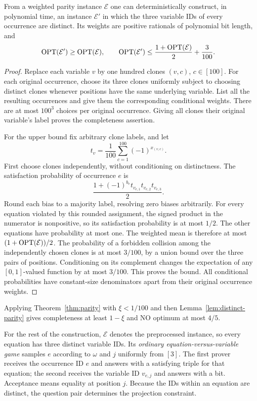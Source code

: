 \begin{lemma}
\label{lem:distinct-parity}
From a weighted parity instance \(\mathcal E\) one can deterministically
construct, in polynomial time, an instance \(\mathcal E'\) in which the
three variable IDs of every occurrence are distinct.  Its weights are
positive rationals of polynomial bit length, and
\[
 \operatorname{OPT}(\mathcal E')\ge\operatorname{OPT}(\mathcal E),
 \qquad
 \operatorname{OPT}(\mathcal E')
 \le \frac{1+\operatorname{OPT}(\mathcal E)}2+\frac3{100}.
\]
\end{lemma}

\begin{proof}
Replace each variable \(v\) by one hundred clones \((v,c)\),
\(c\in[100]\).  For each original occurrence, choose its three clones
uniformly subject to choosing distinct clones whenever positions have
the same underlying variable.  List all the resulting occurrences and
give them the corresponding conditional weights.  There are at most
\(100^3\) choices per original occurrence.  Giving all clones their
original variable's label proves the completeness assertion.

For the upper bound fix arbitrary clone labels, and let
\[
 t_v=\frac1{100}\sum_{c=1}^{100}(-1)^{x_{(v,c)}}.
\]
First choose clones independently, without conditioning on distinctness.
The satisfaction probability of occurrence \(e\) is
\[
 \frac{1+(-1)^{b_e}t_{v_{e,1}}t_{v_{e,2}}t_{v_{e,3}}}{2}.
\]
Round each bias to a majority label, resolving zero biases arbitrarily.
For every equation violated by this rounded assignment, the signed
product in the numerator is nonpositive, so its satisfaction probability
is at most \(1/2\).  The other equations have probability at most one.
The weighted mean is therefore at most
\((1+\operatorname{OPT}(\mathcal E))/2\).  The probability of a forbidden collision
among the independently chosen clones is at most \(3/100\), by a union
bound over the three pairs of positions.  Conditioning on its complement
changes the expectation of any \([0,1]\)-valued function by at most
\(3/100\).  This proves the bound.  All conditional probabilities have
constant-size denominators apart from their original occurrence weights.
\end{proof}

Applying Theorem~\ref{thm:parity} with \(\xi<1/100\) and then
Lemma~\ref{lem:distinct-parity} gives completeness at least \(1-\xi\)
and NO optimum at most \(4/5\).

For the rest of the construction, \(\mathcal E\) denotes the
preprocessed instance, so every equation has three distinct variable
IDs.  Its \emph{ordinary equation-versus-variable game} samples
\(e\) according to \(\omega\) and \(j\) uniformly from \([3]\).
The first prover receives the occurrence ID \(e\) and answers with a
satisfying triple for that equation; the second receives the variable ID
\(v_{e,j}\) and answers with a bit.  Acceptance means equality at
position \(j\).  Because the IDs within an equation are distinct,
the question pair determines the projection constraint.

